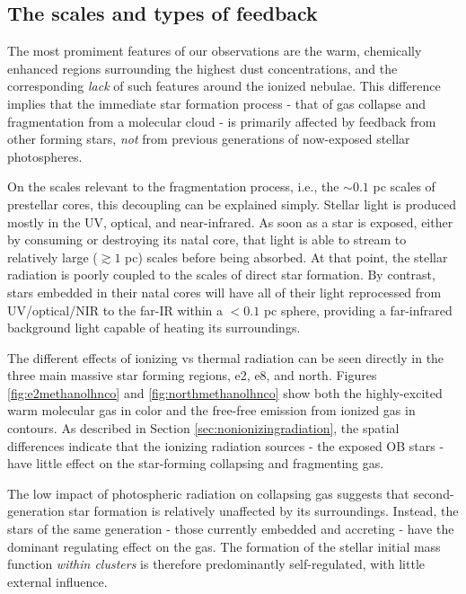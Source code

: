 \documentclass{aa}
\begin{document}
\subsection{The scales and types of feedback}
The most promiment features of our observations are the warm, chemically
enhanced regions surrounding the highest dust concentrations, and the
corresponding \emph{lack} of such features around the ionized nebulae.  This
difference implies that the immediate star formation process - that of gas
collapse and fragmentation from a molecular cloud - is primarily affected by
feedback from other forming stars, \emph{not} from previous generations of
now-exposed stellar photospheres.

On the scales relevant to the fragmentation process, i.e., the $\sim0.1$ pc
scales of prestellar cores, this decoupling can be explained simply.  Stellar
light is produced mostly in the UV, optical, and near-infrared.  As soon as a
star is exposed, either by consuming or destroying its natal core, that light
is able to stream to relatively large ($\gtrsim1$ pc) scales before being
absorbed.  At that point, the stellar radiation is poorly coupled to the scales
of direct star formation.  By contrast, stars embedded in their natal cores
will have all of their light reprocessed from UV/optical/NIR to the far-IR
within a $<0.1$ pc sphere, providing a far-infrared background light capable of
heating its surroundings.

The different effects of ionizing vs thermal radiation can be seen directly in
the three main massive star forming regions, e2, e8, and north.  Figures
\ref{fig:e2methanolhnco} and \ref{fig:northmethanolhnco} show both the
highly-excited warm molecular gas in color and the free-free emission from
ionized gas in contours.  As described in Section
\ref{sec:nonionizingradiation}, the spatial differences indicate that the
ionizing radiation sources - the exposed OB stars - have little effect on the
star-forming collapsing and fragmenting gas.

The low impact of photospheric radiation on collapsing gas suggests that
second-generation star formation is relatively unaffected by its surroundings.
Instead, the stars of the same generation - those currently embedded and
accreting - have the dominant regulating effect on the gas.  The formation of
the stellar initial mass function \emph{within clusters} is therefore
predominantly self-regulated, with little external influence.

\end{document}
